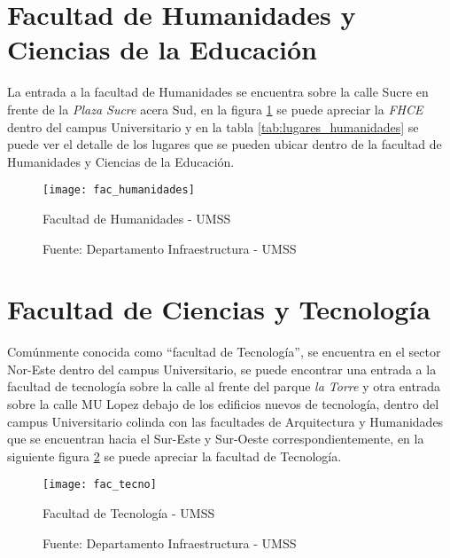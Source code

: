 \section{Facultad de Humanidades y Ciencias de la Educación}
\label{sec:facultad_humanidades}

La entrada a la facultad de Humanidades se encuentra sobre la calle Sucre en frente de la \emph{Plaza Sucre} acera Sud, en la figura \ref{fig:fac_humanidades} se puede apreciar la \emph{FHCE} dentro del campus Universitario y en la tabla \ref{tab:lugares_humanidades} se puede ver el detalle de los lugares que se pueden ubicar dentro de la facultad de Humanidades y Ciencias de la Educación.

\begin{figure}[H]
 \begin{center}
   \texttt{[image: fac\_humanidades]}
   \caption{Facultad de Humanidades - UMSS}
   \label{fig:fac_humanidades}
   \caption*{Fuente: Departamento Infraestructura - UMSS}
 \end{center}
\end{figure}




\section{Facultad de Ciencias y Tecnología}
\label{sec:facultad_tecnologia}

Comúnmente conocida como ``facultad de Tecnología'',  se encuentra en el sector Nor-Este dentro del campus Universitario, se puede encontrar una entrada a la facultad de tecnología sobre la calle  al frente del parque \emph{la Torre} y otra entrada sobre la calle MU Lopez debajo de los edificios nuevos de tecnología, dentro del campus Universitario colinda con las facultades de Arquitectura y Humanidades que se encuentran hacia el Sur-Este y Sur-Oeste correspondientemente, en la siguiente figura \ref{fig:fac_tecno} se puede apreciar la facultad de Tecnología.

\begin{figure}[H]
 \begin{center}
   \texttt{[image: fac\_tecno]}
   \caption{Facultad de Tecnología - UMSS}
   \label{fig:fac_tecno}
   \caption*{Fuente: Departamento Infraestructura - UMSS}
 \end{center}
\end{figure}

